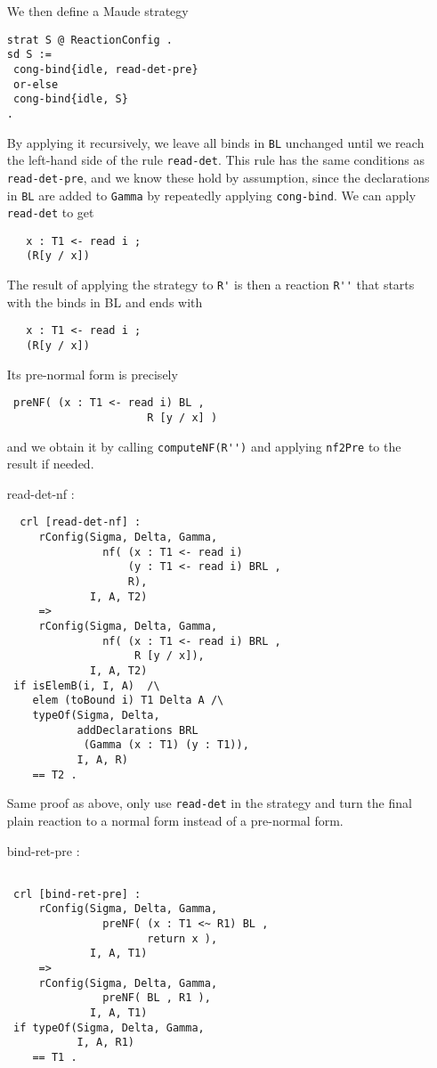 \documentclass{article}
\begin{document}
\begin{itemize}
We then define a Maude strategy 
\begin{lstlisting} 
strat S @ ReactionConfig .
sd S := 
 cong-bind{idle, read-det-pre}
 or-else
 cong-bind{idle, S}
.
  \end{lstlisting}
By applying it recursively, we leave all binds in \verb+BL+ 
unchanged until we reach
the left-hand side of the rule \verb+read-det+.
This rule has the 
same conditions as \verb+read-det-pre+, and we know these hold by assumption,
since the declarations in \verb+BL+ are added to \verb+Gamma+ by repeatedly applying \verb+cong-bind+.
We can apply \verb+read-det+ to get
 \begin{lstlisting}
   x : T1 <- read i ;  
   (R[y / x])
 \end{lstlisting}
The result of applying the strategy to  \verb+R'+ is then 
a reaction \verb+R''+ that starts with the binds in BL
and ends with
 \begin{lstlisting}
   x : T1 <- read i ;  
   (R[y / x])
 \end{lstlisting}
 Its pre-normal form is precisely 
 \begin{lstlisting}
 preNF( (x : T1 <- read i) BL , 
                      R [y / x] )
 \end{lstlisting}
 and we obtain it by calling \verb+computeNF(R'')+ and applying
 \verb+nf2Pre+ to the result if needed.
 
\item[read-det-nf]:
\begin{lstlisting}
  crl [read-det-nf] :
     rConfig(Sigma, Delta, Gamma, 
               nf( (x : T1 <- read i) 
                   (y : T1 <- read i) BRL , 
                   R), 
             I, A, T2) 
     =>
     rConfig(Sigma, Delta, Gamma, 
               nf( (x : T1 <- read i) BRL , 
                    R [y / x]), 
             I, A, T2) 
 if isElemB(i, I, A)  /\ 
    elem (toBound i) T1 Delta A /\
    typeOf(Sigma, Delta, 
           addDeclarations BRL 
            (Gamma (x : T1) (y : T1)), 
           I, A, R) 
    == T2 . 
   \end{lstlisting} 
   
 Same proof as above, only use \verb+read-det+ in the strategy and
 turn the final plain reaction to a normal form instead of a 
 pre-normal form.  
 
\item[bind-ret-pre]:
\begin{lstlisting}
                
 crl [bind-ret-pre] : 
     rConfig(Sigma, Delta, Gamma, 
               preNF( (x : T1 <~ R1) BL , 
                      return x ), 
             I, A, T1) 
     =>
     rConfig(Sigma, Delta, Gamma, 
               preNF( BL , R1 ), 
             I, A, T1) 
 if typeOf(Sigma, Delta, Gamma, 
           I, A, R1) 
    == T1 .  
  

\end{lstlisting}
\end{itemize}
\end{document}
